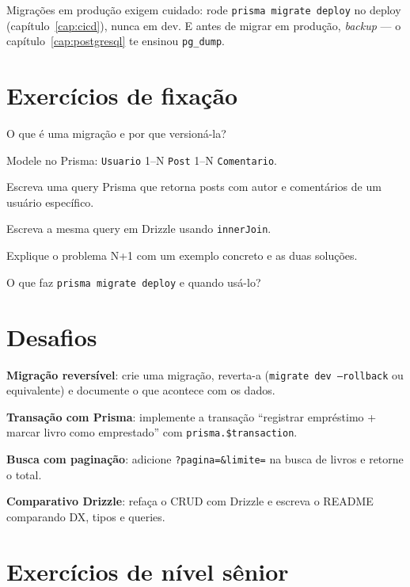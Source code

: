 \begin{caixadica}
Migrações em produção exigem cuidado: rode \texttt{prisma migrate deploy}
no deploy (capítulo~\ref{cap:cicd}), nunca em dev. E antes de migrar em
produção, \emph{backup} — o capítulo~\ref{cap:postgresql} te ensinou
\texttt{pg\_dump}.
\end{caixadica}

\section{Exercícios de fixação}

\begin{exercicios}
  \item O que é uma migração e por que versioná-la?
  \item Modele no Prisma: \texttt{Usuario} 1--N \texttt{Post} 1--N \texttt{Comentario}.
  \item Escreva uma query Prisma que retorna posts com autor e comentários de um usuário específico.
  \item Escreva a mesma query em Drizzle usando \texttt{innerJoin}.
  \item Explique o problema N+1 com um exemplo concreto e as duas soluções.
  \item O que faz \texttt{prisma migrate deploy} e quando usá-lo?
\end{exercicios}

\section{Desafios}

\begin{desafios}
  \item \textbf{Migração reversível}: crie uma migração, reverta-a (\texttt{migrate dev --rollback} ou equivalente) e documente o que acontece com os dados.
  \item \textbf{Transação com Prisma}: implemente a transação ``registrar empréstimo + marcar livro como emprestado'' com \texttt{prisma.\$transaction}.
  \item \textbf{Busca com paginação}: adicione \texttt{?pagina=\&limite=} na busca de livros e retorne o total.
  \item \textbf{Comparativo Drizzle}: refaça o CRUD com Drizzle e escreva o README comparando DX, tipos e queries.
\end{desafios}

\section{Exercícios de nível sênior}

